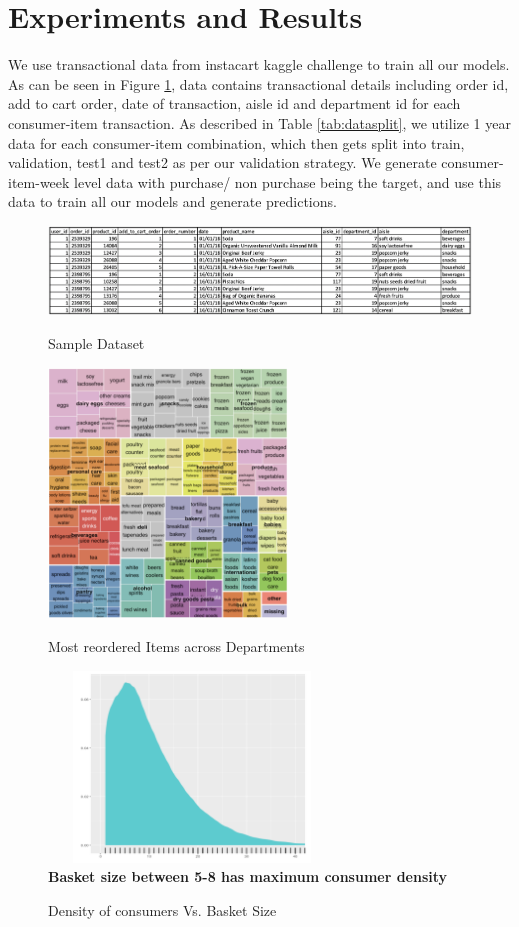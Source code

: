 \section{Experiments and Results}
\label{sec:eval}
We use transactional data from instacart kaggle challenge to train all our models. As can 
be seen in Figure \ref{fig:sampledata}, data contains transactional details including
order id, add to cart order, date of transaction, aisle id and department id for each consumer-item transaction.
As described in Table \ref{tab:datasplit}, we utilize 1 year data for each consumer-item combination, 
which then gets split into train, validation, test1 and test2 as per our validation strategy. 
We generate consumer-item-week level data with purchase/ non purchase being the target,
and use this data to train all our models and generate predictions.
 \begin{figure}[!t]
    \centering 
    \caption{Sample Dataset} 
    \includegraphics[width=6.6in]{img/sampledata.png} 
    \label{fig:sampledata} 
  \end{figure}

  \begin{figure}[t]
    \centering 
    \caption{Most reordered Items across Departments} 
    \includegraphics[width=2.5in]{img/items.png} 
    \label{fig:items} 
  \end{figure}

  \begin{figure}[t]
    \centering 
    \caption{Density of consumers Vs. Basket Size} 
    \includegraphics[width=3in, height = 2in]{img/basket.png} 
    \\ {\scriptsize \bf Basket size between 5-8 has maximum consumer density}
    \label{fig:basket} 
  \end{figure}


